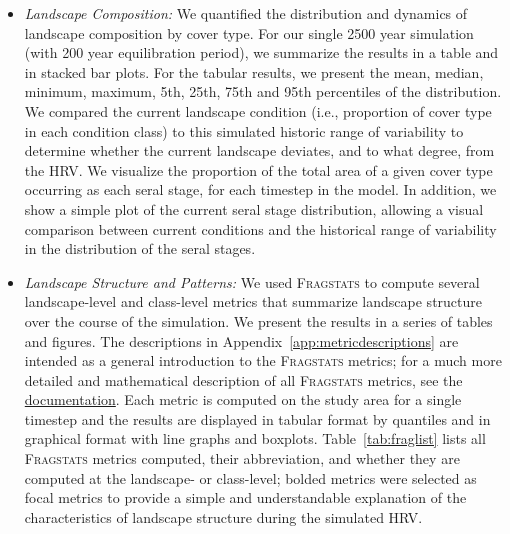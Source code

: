\begin{itemize}
\item \emph{Landscape Composition:} We quantified the distribution and dynamics of landscape composition by cover type. For our single 2500 year simulation (with 200 year equilibration period), we summarize the results in a table and in stacked bar plots. For the tabular results, we present the mean, median, minimum, maximum, 5th, 25th, 75th and 95th percentiles of the distribution. We compared the current landscape condition (i.e., proportion of cover type in each condition class) to this simulated historic range of variability to determine whether the current landscape deviates, and to what degree, from the HRV. We visualize the proportion of the total area of a given cover type occurring as each seral stage, for each timestep in the model. In addition, we show a simple plot of the current seral stage distribution, allowing a visual comparison between current conditions and the historical range of variability in the distribution of the seral stages.

\item \emph{Landscape Structure and Patterns:} We used \textsc{Fragstats} \citep{McGarigal2012} to compute several landscape-level and class-level metrics that summarize landscape structure over the course of the simulation. We present the results in a series of tables and figures. The descriptions in Appendix~\ref{app:metricdescriptions} are intended as a general introduction to the \textsc{Fragstats} metrics; for a much more detailed and mathematical description of all \textsc{Fragstats} metrics, see the \href{http://www.umass.edu/landeco/research/fragstats/documents/fragstats.help.4.2.pdf}{documentation}. Each metric is computed on the study area for a single timestep and the results are displayed in tabular format by quantiles and in graphical format with line graphs and boxplots. Table~\ref{tab:fraglist} lists all \textsc{Fragstats} metrics computed, their abbreviation, and whether they are computed at the landscape- or class-level; bolded metrics were selected as focal metrics to provide a simple and understandable explanation of the characteristics of landscape structure during the simulated HRV.


\end{itemize}
